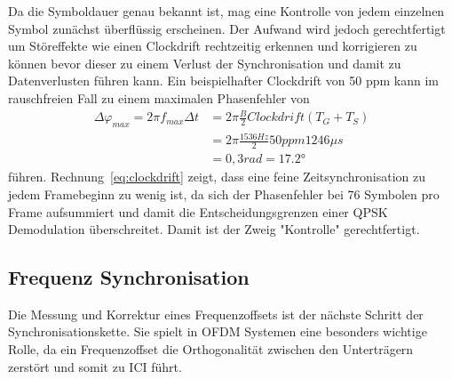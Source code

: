 Da die Symboldauer genau bekannt ist, mag eine Kontrolle von jedem einzelnen Symbol zunächst überflüssig erscheinen. Der Aufwand wird jedoch gerechtfertigt um Störeffekte wie einen Clockdrift rechtzeitig erkennen und korrigieren zu können bevor dieser zu einem Verlust der Synchronisation und damit zu Datenverlusten führen kann.
Ein beispielhafter Clockdrift von 50 ppm kann im rauschfreien Fall zu einem maximalen Phasenfehler von
\begin{equation}
\begin{aligned}
    \Delta\varphi_{max} = 2 \pi f_{max} \Delta t &= 2 \pi \frac{B}{2} Clockdrift (T_G+T_S) \\
    &=  2 \pi \frac{1536 Hz}{2} 50ppm 1246\mu s \\
    &= 0,3 rad = \ang{17,2}
    \end{aligned}
    \label{eq:clockdrift}
\end{equation}
führen. Rechnung~\ref{eq:clockdrift} zeigt, dass eine feine Zeitsynchronisation zu jedem Framebeginn zu wenig ist, da sich der Phasenfehler bei 76 Symbolen pro Frame aufsummiert und damit die Entscheidungsgrenzen einer QPSK Demodulation überschreitet. Damit ist der Zweig "Kontrolle" gerechtfertigt.


\subsection{Frequenz Synchronisation}
Die Messung und Korrektur eines Frequenzoffsets ist der nächste Schritt der Synchronisationskette. Sie spielt in OFDM Systemen eine besonders wichtige Rolle, da ein Frequenzoffset die Orthogonalität zwischen den Unterträgern zerstört und somit zu \ac{ICI} führt.

